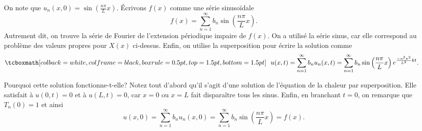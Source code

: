 On note que $u_n(x,0) = \sin \left( \frac{n \pi}{L} x \right)$.  Écrivons $f(x)$ comme une série sinusoïdale
\begin{equation*}
f(x) = \sum_{n=1}^\infty b_n \sin \left(\frac{n \pi}{L}  x \right) .
\end{equation*}
Autrement dit,  on trouve la série de Fourier de l'extension périodique impaire de $ f (x) $.
On a utilisé la série sinus,  car elle correspond au problème des valeurs propres pour
$ X (x) $ ci-dessus.
Enfin,  on utilise la superposition pour écrire la solution comme
\begin{equation*}
\mybxbg{~~
u(x,t) = 
\sum_{n=1}^\infty
b_n
u_n(x,t)
=
\sum_{n=1}^\infty
b_n
\sin \left( \frac{n \pi}{L}  x \right)
e^{\frac{-n^2 \pi^2}{L^2} k t} .
~~}
\end{equation*}

Pourquoi cette solution fonctionne-t-elle? Notez tout d'abord qu'il s'agit d'une solution de
l'équation de la chaleur par superposition.  Elle satisfait à $ u (0, t) = 0 $
et à $ u (L, t) = 0 $,  car $ x = 0 $ ou $ x = L $ fait disparaître tous les sinus.
Enfin,  en branchant $ t = 0 $,  on remarque que $ T_n (0) = 1 $ et ainsi
\begin{equation*}
u(x,0) = 
\sum_{n=1}^\infty
b_n
u_n(x,0)
=
\sum_{n=1}^\infty
b_n
\sin \left( \frac{n \pi}{L} x \right)
=
f(x) .
\end{equation*}

